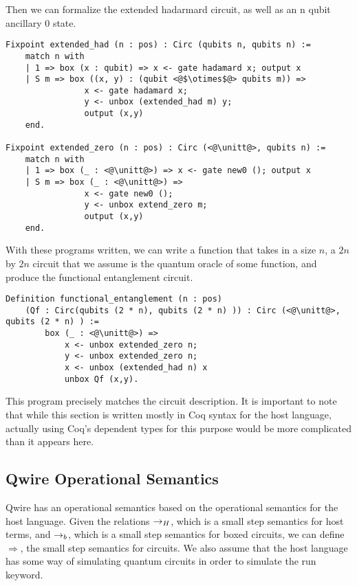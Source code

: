 Then we can formalize the extended hadarmard circuit, as well as an n qubit ancillary 0 state.
\begin{lstlisting}[style=customcoq]
Fixpoint extended_had (n : pos) : Circ (qubits n, qubits n) :=
    match n with
    | 1 => box (x : qubit) => x <- gate hadamard x; output x
    | S m => box ((x, y) : (qubit <@$\otimes$@> qubits m)) => 
                x <- gate hadamard x;
                y <- unbox (extended_had m) y;
                output (x,y)
    end.

Fixpoint extended_zero (n : pos) : Circ (<@\unitt@>, qubits n) :=
    match n with
    | 1 => box (_ : <@\unitt@>) => x <- gate new0 (); output x
    | S m => box (_ : <@\unitt@>) =>
                x <- gate new0 ();
                y <- unbox extend_zero m;
                output (x,y)
    end.
\end{lstlisting}


With these programs written, we can write a function that takes in a size $n$, a $2n$ by $2n$ circuit that we assume is the quantum oracle of some function, and produce the functional entanglement circuit.
\begin{lstlisting}[style=customcoq]
Definition functional_entanglement (n : pos) 
    (Qf : Circ(qubits (2 * n), qubits (2 * n) )) : Circ (<@\unitt@>, qubits (2 * n) ) :=
        box (_ : <@\unitt@>) =>
            x <- unbox extended_zero n;
            y <- unbox extended_zero n;
            x <- unbox (extended_had n) x 
            unbox Qf (x,y).
\end{lstlisting}

This program precisely matches the circuit description.
It is important to note that while this section is written mostly in Coq syntax for the host language, actually using Coq's dependent types for this purpose would be more complicated than it appears here.

\subsection{Qwire Operational Semantics}
Qwire has an operational semantics based on the operational semantics for the host language.
Given the relations $\rightarrow_{H}$, which is a small step semantics for host terms, and $\rightarrow_{b}$, which is a small step semantics for boxed circuits,
we can define $\Rightarrow$, the small step semantics for circuits.
We also assume that the host language has some way of simulating quantum circuits in order to simulate the run keyword.

